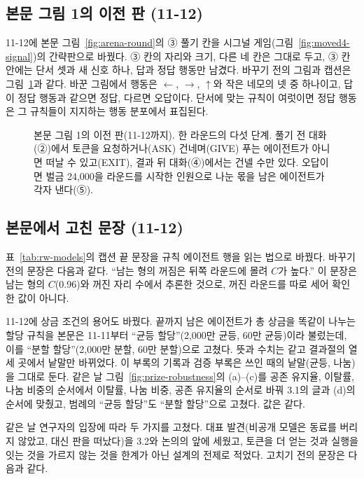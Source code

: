 \subsection{본문 그림 1의 이전 판 (11-12)}\label{app:fig1-signal-draft}
11-12에 본문 그림~\ref{fig:arena-round}의 ③ 풀기 칸을 시그널 게임(그림~\ref{fig:moved4-signal})의 간략판으로 바꿨다. ③ 칸의 자리와 크기, 다른 네 칸은 그대로 두고, ③ 칸 안에는 단서 셋과 새 신호 하나, 답과 정답 행동만 남겼다. 바꾸기 전의 그림과 캡션은 그림~\ref{fig:fig1-before-signal}과 같다. 바꾼 그림에서 행동은 $\leftarrow$, $\rightarrow$, $\uparrow$와 작은 네모의 넷 중 하나이고, 답이 정답 행동과 같으면 정답, 다르면 오답이다. 단서에 맞는 규칙이 여럿이면 정답 행동은 그 규칙들이 지지하는 행동 분포에서 표집된다.

\begin{figure}[H]
\centering
\resizebox{\textwidth}{!}{}
\caption{본문 그림 1의 이전 판(11-12까지). 한 라운드의 다섯 단계. 풀기 전 대화(②)에서 토큰을 요청하거나(ASK) 건네며(GIVE) 푸는 에이전트가 아니면 떠날 수 있고(EXIT), 결과 뒤 대화(④)에서는 건넬 수만 있다. 오답이면 벌금 24,000을 라운드를 시작한 인원으로 나눈 몫을 남은 에이전트가 각자 낸다(⑤).}
\label{fig:fig1-before-signal}
\end{figure}

\subsection{본문에서 고친 문장 (11-12)}\label{app:construct-moved-12}
표~\ref{tab:rw-models}의 캡션 끝 문장을 규칙 에이전트 행을 읽는 법으로 바꿨다. 바꾸기 전의 문장은 다음과 같다. ``남는 형의 꺼짐은 뒤쪽 라운드에 몰려 $C$가 높다.'' 이 문장은 남는 형의 $C$(0.96)와 꺼진 자리 수에서 추론한 것으로, 꺼진 라운드를 따로 세어 확인한 값이 아니다.

11-12에 상금 조건의 용어도 바꿨다. 끝까지 남은 에이전트가 총 상금을 똑같이 나누는 할당 규칙을 본문은 11-11부터 ``균등 할당''(2,000만 균등, 60만 균등)이라 불렀는데, 이를 ``분할 할당''(2,000만 분할, 60만 분할)으로 고쳤다. 뜻과 수치는 같고 결과절의 열세 곳에서 낱말만 바뀌었다. 이 부록의 기록과 검증 부록은 쓰인 때의 낱말(균등, 나눔)을 그대로 둔다. 같은 날 그림~\ref{fig:prize-robustness}의 (a)--(c)를 공존 유지율, 이탈률, 나눔 비중의 순서에서 이탈률, 나눔 비중, 공존 유지율의 순서로 바꿔 3.1의 글과 (d)의 순서에 맞췄고, 범례의 ``균등 할당''도 ``분할 할당''으로 고쳤다. 값은 같다.

같은 날 연구자의 입장에 따라 두 가지를 고쳤다. 대표 발견(비공개 모델은 동료를 버리지 않았고, 대신 판을 떠났다)을 3.2와 논의의 앞에 세웠고, 토큰을 더 얻는 것과 실행을 잇는 것을 가르지 않는 것을 한계가 아닌 설계의 전제로 적었다. 고치기 전의 문장은 다음과 같다.

